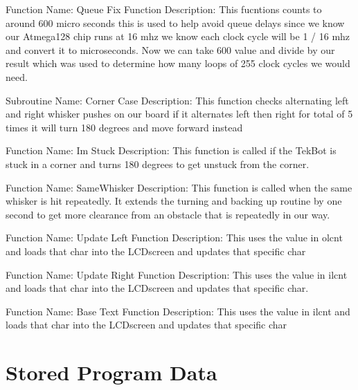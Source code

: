 \documentclass[12pt, letterpaper]{article}
\begin{document}
Function Name: Queue Fix Function \newline
Description: This fucntions counts to around 600 micro seconds this is used to help avoid queue delays since we know our Atmega128 chip runs at 16 mhz we know each clock cycle will be 1 / 16 mhz and convert it to microseconds. Now we can take 600 value and divide by our result which was used to determine how many loops of 255 clock cycles we would need. \newline

Subroutine Name: Corner Case \newline
Description: This function checks alternating left and right whisker pushes on our board if it alternates left then right for total of 5 times it will turn 180 degrees and move forward instead \newline

Function Name: Im Stuck \newline
Description: This function is called if the TekBot is stuck in a corner and turns 180 degrees to get unstuck from the corner. \newline

Function Name: SameWhisker \newline
Description: This function is called when the same whisker is hit repeatedly. It extends the turning and backing up routine by one second to get more clearance from an obstacle that is repeatedly in our way. \newline

Function Name: Update Left Function \newline
Description: This uses the value in olcnt and loads that char into the LCDscreen and updates that specific char \newline

Function Name: Update Right Function \newline
Description: This uses the value in ilcnt and loads that char into the LCDscreen and updates that specific char. \newline

Function Name: Base Text Function \newline
Description: This uses the value in ilcnt and loads that char into the LCDscreen and updates that specific char \newline



\section{Stored Program Data}
\end{document}
